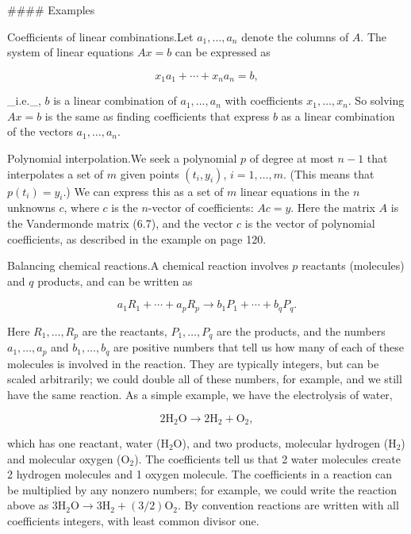 

#### Examples

Coefficients of linear combinations.Let \(a_{1},\ldots,a_{n}\) denote the columns of \(A\). The system of linear equations \(Ax=b\) can be expressed as

\[x_{1}a_{1}+\cdots+x_{n}a_{n}=b,\]

_i.e._, \(b\) is a linear combination of \(a_{1},\ldots,a_{n}\) with coefficients \(x_{1},\ldots,x_{n}\). So solving \(Ax=b\) is the same as finding coefficients that express \(b\) as a linear combination of the vectors \(a_{1},\ldots,a_{n}\).

Polynomial interpolation.We seek a polynomial \(p\) of degree at most \(n-1\) that interpolates a set of \(m\) given points \((t_{i},y_{i})\), \(i=1,\ldots,m\). (This means that \(p(t_{i})=y_{i}\).) We can express this as a set of \(m\) linear equations in the \(n\) unknowns \(c\), where \(c\) is the \(n\)-vector of coefficients: \(Ac=y\). Here the matrix \(A\) is the Vandermonde matrix (6.7), and the vector \(c\) is the vector of polynomial coefficients, as described in the example on page 120.

Balancing chemical reactions.A chemical reaction involves \(p\) reactants (molecules) and \(q\) products, and can be written as

\[a_{1}R_{1}+\cdots+a_{p}R_{p}\longrightarrow b_{1}P_{1}+\cdots+b_{q}P_{q}.\]

Here \(R_{1},\ldots,R_{p}\) are the reactants, \(P_{1},\ldots,P_{q}\) are the products, and the numbers \(a_{1},\ldots,a_{p}\) and \(b_{1},\ldots,b_{q}\) are positive numbers that tell us how many of each of these molecules is involved in the reaction. They are typically integers, but can be scaled arbitrarily; we could double all of these numbers, for example, and we still have the same reaction. As a simple example, we have the electrolysis of water,

\[2\mathrm{H}_{2}\mathrm{O}\longrightarrow 2\mathrm{H}_{2}+\mathrm{O}_{2},\]

which has one reactant, water (\(\mathrm{H}_{2}\mathrm{O}\)), and two products, molecular hydrogen (\(\mathrm{H}_{2}\)) and molecular oxygen (\(\mathrm{O}_{2}\)). The coefficients tell us that 2 water molecules create 2 hydrogen molecules and 1 oxygen molecule. The coefficients in a reaction can be multiplied by any nonzero numbers; for example, we could write the reaction above as \(3\mathrm{H}_{2}\mathrm{O}\longrightarrow 3\mathrm{H}_{2}+(3/2)\mathrm{O}_{2}\). By convention reactions are written with all coefficients integers, with least common divisor one.

